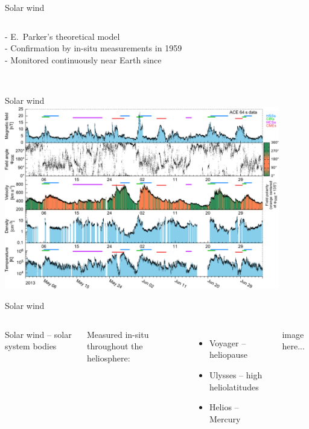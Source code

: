 \begin{frame}[plain,c]{Solar wind}{}
	\begin{columns}[c]
	\column{\textwidth}
		
		- E.~Parker's theoretical model \citep{Parker1958}\\
		- Confirmation by in-situ measurements in 1959\\
		- Monitored continuously near Earth since\\\ \\
		
	\end{columns}
\end{frame}
\begin{frame}[plain,c]{Solar wind}{}
	\centering
	\includegraphics[width=0.9\textwidth]{../figures_of_mine/gnuplots/ACE_64s_v7_thesis_CIRs_2013-5-1_65_plot.pdf}
\end{frame}
\begin{frame}[plain,c]{Solar wind}{}
	\begin{columns}[c]
		Solar wind -- solar system bodies\\\ 

		Measured in-situ throughout the heliosphere:
		\begin{itemize}
			\item Voyager -- heliopause
			\item Ulysses -- high heliolatitudes
			\item Helios -- Mercury
		\end{itemize}
		
		
		image here...

	\end{columns}
\end{frame}

